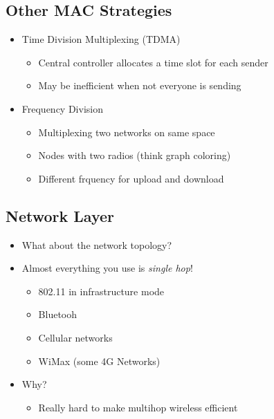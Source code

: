 \subsection{Other MAC Strategies}
\begin{itemize}[nosep]
    \item Time Division Multiplexing (TDMA)
          \begin{itemize}[nosep]
              \item Central controller allocates a time slot for each sender
              \item May be inefficient when not everyone is sending
          \end{itemize}
    \item Frequency Division
          \begin{itemize}[nosep]
              \item Multiplexing two networks on same space
              \item Nodes with two radios (think graph coloring)
              \item Different frquency for upload and download
          \end{itemize}
\end{itemize}

\subsection{Network Layer}
\begin{itemize}[nosep]
    \item What about the network topology?
    \item Almost everything you use is \emph{single hop}!
          \begin{itemize}[nosep]
              \item 802.11 in infrastructure mode
              \item Bluetooh
              \item Cellular networks
              \item WiMax (some 4G Networks)
          \end{itemize}
    \item Why?
          \begin{itemize}[nosep]
              \item Really hard to make multihop wireless efficient
          \end{itemize}
\end{itemize}

